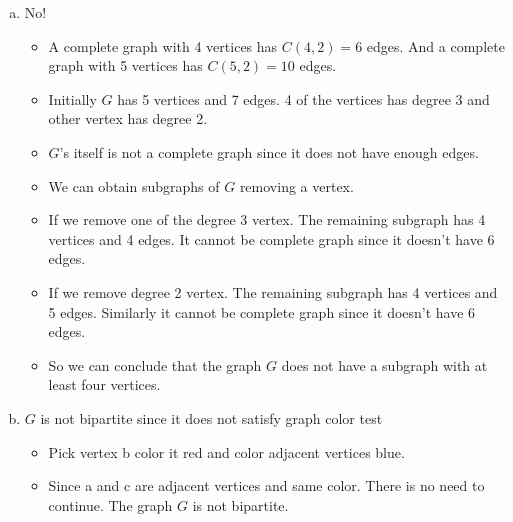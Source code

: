 \documentclass[12pt]{article}
\begin{document}
\begin{enumerate} [a)]
     \item No!
     \begin{itemize}
         \item A complete graph with 4 vertices has $C(4,2) =6$ edges. And a complete graph with 5 vertices has $C(5,2) =10$ edges.
         \item Initially $G$ has 5 vertices and 7 edges. 4 of the vertices has degree 3 and other vertex has degree 2.
         \item $G$'s itself is not a complete graph since it does not have enough edges.
         \item We can obtain subgraphs of $G$ removing a vertex.
         \item If we remove one of the degree 3 vertex. The remaining subgraph has 4 vertices and 4 edges. It cannot be complete graph since it doesn't have 6 edges.
         \item If we remove degree 2 vertex. The remaining subgraph has 4 vertices and 5 edges. Similarly it cannot be complete graph since it doesn't have 6 edges.
         \item So we can conclude that the graph $G$ does not have a subgraph with at least four vertices.
     \end{itemize}
     \item $G$ is not bipartite since it does not satisfy graph color test
     \begin{itemize}
         \item Pick vertex b color it red and color adjacent vertices blue.
         \item Since a and c are adjacent vertices and same color. There is no need to continue. The graph $G$ is not bipartite.
     \end{itemize}
     \begin{figure}[H]
	\centering
\end{figure}
\end{enumerate}
\end{document}
